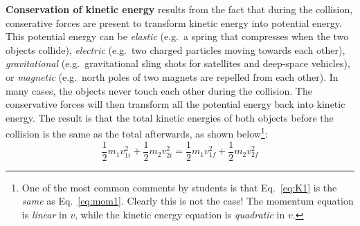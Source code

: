 \documentclass{../../oss-handout}
\begin{document}
\textbf{Conservation of kinetic energy} results from the fact that during the
collision, conserative forces are present to transform kinetic energy into 
potential energy. This potential energy can be \emph{elastic}  (e.g.\ a spring 
that compresses when the two objects collide), \emph{electric} (e.g.\ two
charged particles moving towards each other), \emph{gravitational} (e.g.\
gravitational sling shots for satellites and deep-space vehicles), or
\emph{magnetic} (e.g.\ north poles of two magnets are repelled from each
other). In many cases, the objects never touch each other during the collision.
The conservative forces will then transform all the potential energy back into
kinetic energy. The result is that the total kinetic energies of both objects
before the collision is the same as the total afterwards, as shown
below\footnote{One of the most common comments by students
  is that Eq.~\ref{eq:K1} is the \emph{same} as Eq.~\ref{eq:mom1}. Clearly this
  is not the case! The momentum equation is \emph{linear} in $v$, while the
  kinetic energy equation is \emph{quadratic} in $v$.}:
\begin{equation}
  \frac12 m_1v_{1i}^2+\frac12m_2v_{2i}^2=\frac12 m_1v_{1f}^2+\frac12 m_2v_{2f}^2
  \label{eq:K1}
\end{equation}
\end{document}
